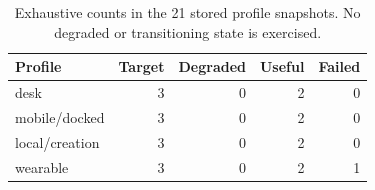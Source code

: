 \begin{table}[t]
\centering
\caption{Exhaustive counts in the 21 stored profile snapshots. No degraded or transitioning state is exercised.}
\label{tab:fixture}
\small
\begin{tabular}{lrrrr}
\toprule
Profile & Target & Degraded & Useful & Failed \\
\midrule
desk & 3 & 0 & 2 & 0 \\
mobile/docked & 3 & 0 & 2 & 0 \\
local/creation & 3 & 0 & 2 & 0 \\
wearable & 3 & 0 & 2 & 1 \\
\bottomrule
\end{tabular}
\end{table}
